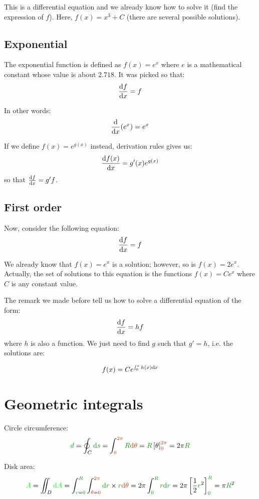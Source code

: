 This is a differential equation and we already know how to solve it
(find the expression of $f$). Here, $f(x) = x^3 + C$ (there are several
possible solutions).


\subsection{Exponential}

The exponential function is defined as $f(x) = e^x$ where $e$ is a
mathematical constant whose value is about $2.718$. It was picked so that:
\[
\frac {\mathrm{d} f} {\mathrm{d} x} = f
\]

In other words:
\[
\frac {\mathrm{d}} {\mathrm{d} x} (e^x) = e^x
\]

\begin{remark}
If we define $f(x) = e^{g(x)}$ instead, derivation rules
gives us:
\[
\frac {\mathrm{d} f(x)} {\mathrm{d} x}
= g'(x) e^{g(x)}
\]
so that $\frac {\mathrm{d} f} {\mathrm{d} x} = g' f$.
\end{remark}


\subsection{First order}

Now, consider the following equation:
\[
\frac {\mathrm{d} f} {\mathrm{d} x} = f
\]

We already know that $f(x) = e^x$ is a solution; however, so is $f(x) =
2 e^x$. Actually, the set of solutions to this equation is the functions
$f(x) = C e^x$ where $C$ is any constant value.

The remark we made before tell us how to solve a differential equation
of the form:
\[
\frac {\mathrm{d} f} {\mathrm{d} x} = h f
\]
where $h$ is also a function. We just need to find $g$ such that $g' =
h$, i.e. the solutions are:

\[
f(x) = C e^{\int_0^x h(x) \mathrm{d} x}
\]


\section{Geometric integrals}

Circle circumference:
\[
\dist{d}
= \oint_C \dist{\d s}
= \int_{\angle{0}}^{\angle{2\pi}} \dist{R} \angle{\d \theta}
= \dist{R} \left[ \theta \right]_{\angle{0}}^{\angle{2\pi}}
= 2\pi \dist{R}
\]

Disk area:
\[
\area{A}
= \iint_D \area{\d A}
= \int_{\dist{r}=\dist{0}}^{\dist{R}}
  \int_{\angle{\theta}=\angle{0}}^{\angle{2\pi}}
  \dist{\d r} \times \dist{r} \angle{\d \theta}
= 2\pi \int_{\dist{0}}^{\dist{R}} \dist{r} \dist{\d r}
= 2\pi \left[\frac 1 2 \dist{r}^2\right]_{\dist{0}}^{\dist{R}}
= \pi \dist{R}^2
\]


